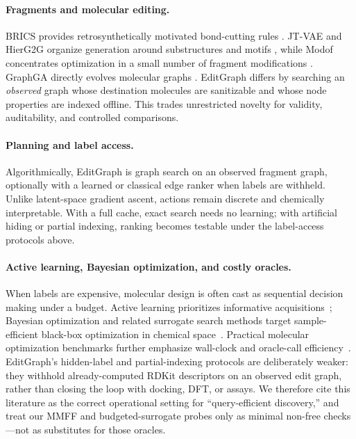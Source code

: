 \paragraph{Fragments and molecular editing.}
BRICS provides retrosynthetically motivated bond-cutting rules \citep{degen2008brics}. JT-VAE and HierG2G organize generation around substructures and motifs \citep{jin2018jtvae,jin2020hierg2g}, while Modof concentrates optimization in a small number of fragment modifications \citep{chen2021modof}. GraphGA directly evolves molecular graphs \citep{jensen2019graphga}. EditGraph differs by searching an \emph{observed} graph whose destination molecules are sanitizable and whose node properties are indexed offline. This trades unrestricted novelty for validity, auditability, and controlled comparisons.

\paragraph{Planning and label access.}
Algorithmically, EditGraph is graph search on an observed fragment graph, optionally with a learned or classical edge ranker when labels are withheld. Unlike latent-space gradient ascent, actions remain discrete and chemically interpretable. With a full cache, exact search needs no learning; with artificial hiding or partial indexing, ranking becomes testable under the label-access protocols above.

\paragraph{Active learning, Bayesian optimization, and costly oracles.}
When labels are expensive, molecular design is often cast as sequential decision making under a budget. Active learning prioritizes informative acquisitions~\citep{settles2009active,reker2015active,graff2021accelerating}; Bayesian optimization and related surrogate search methods target sample-efficient black-box optimization in chemical space~\citep{hernandez2017parallel,korovina2020chembo,griffiths2020constrained,tripp2021sample}. Practical molecular optimization benchmarks further emphasize wall-clock and oracle-call efficiency~\citep{gao2022pmo}. EditGraph's hidden-label and partial-indexing protocols are deliberately weaker: they withhold already-computed RDKit descriptors on an observed edit graph, rather than closing the loop with docking, DFT, or assays. We therefore cite this literature as the correct operational setting for ``query-efficient discovery,'' and treat our MMFF and budgeted-surrogate probes only as minimal non-free checks---not as substitutes for those oracles.

